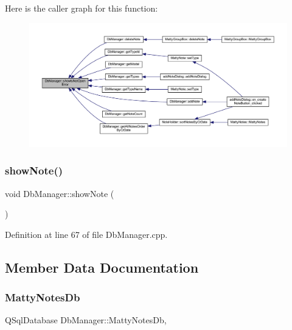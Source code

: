 Here is the caller graph for this function\+:
\nopagebreak
\begin{figure}[H]
\begin{center}
\leavevmode
\includegraphics[width=350pt]{classDbManager_a2d60ab2a556cf0276bf306c7545ed03d_icgraph}
\end{center}
\end{figure}
\hypertarget{classDbManager_a96908aac2c76d86fb1861ac8f755b962}{}\label{classDbManager_a96908aac2c76d86fb1861ac8f755b962} 
\subsubsection{\texorpdfstring{show\+Note()}{showNote()}}
{\footnotesize\ttfamily void Db\+Manager\+::show\+Note (\begin{DoxyParamCaption}{ }\end{DoxyParamCaption})\hspace{0.3cm}{\ttfamily [static]}}



Definition at line 67 of file Db\+Manager.\+cpp.



\subsection{Member Data Documentation}
\hypertarget{classDbManager_a3f6052f559a7a72eef66848ebc9f3eaa}{}\label{classDbManager_a3f6052f559a7a72eef66848ebc9f3eaa} 
\subsubsection{\texorpdfstring{Matty\+Notes\+Db}{MattyNotesDb}}
{\footnotesize\ttfamily Q\+Sql\+Database Db\+Manager\+::\+Matty\+Notes\+Db\hspace{0.3cm}{\ttfamily [static]}, {\ttfamily [private]}}



